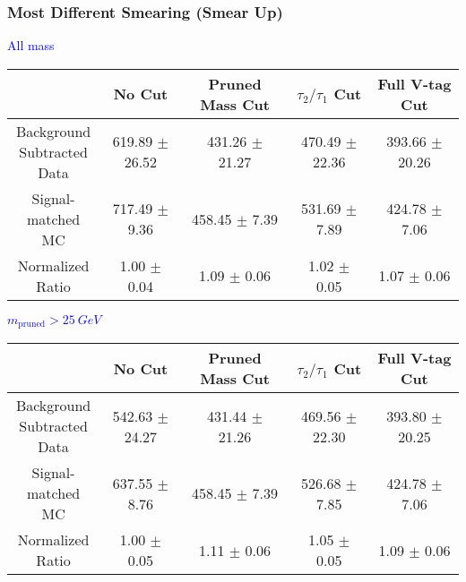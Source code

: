 \documentclass{beamer}
\begin{document}
\begin{frame}
  \frametitle{Most Different Smearing (Smear Up)}
  \begin{adjustwidth}{-1.5em}{-1.5em}
    \centering
    \vspace{6pt}
    \textcolor{blue}{All mass}
    \vspace{6pt}

    {\scriptsize
      \begin{tabular}{c | c | c | c | c}
\hline
 & No Cut & Pruned Mass Cut & $\tau_2/\tau_1$ Cut & Full V-tag Cut \\
\hline
\makecell{Background \\ Subtracted \\ Data} & 619.89 $\pm$ 26.52 & 431.26 $\pm$ 21.27 & 470.49 $\pm$ 22.36 & 393.66 $\pm$ 20.26 \\
\makecell{Signal-\\ matched MC} & 717.49 $\pm$ 9.36 & 458.45 $\pm$ 7.39 & 531.69 $\pm$ 7.89 & 424.78 $\pm$ 7.06 \\
\hline
\makecell{Normalized \\ Ratio} & 1.00 $\pm$ 0.04 & 1.09 $\pm$ 0.06 & 1.02 $\pm$ 0.05 & 1.07 $\pm$ 0.06 \\
\hline
      \end{tabular}
    }

    \vspace{6pt}
    \textcolor{blue}{$m_\text{pruned} > \SI{25}{GeV}$}
    \vspace{6pt}

    {\scriptsize
      \begin{tabular}{c | c | c | c | c}
\hline
 & No Cut & Pruned Mass Cut & $\tau_2/\tau_1$ Cut & Full V-tag Cut \\
\hline
\makecell{Background \\ Subtracted \\ Data} & 542.63 $\pm$ 24.27 & 431.44 $\pm$ 21.26 & 469.56 $\pm$ 22.30 & 393.80 $\pm$ 20.25 \\
\makecell{Signal-\\ matched MC} & 637.55 $\pm$ 8.76 & 458.45 $\pm$ 7.39 & 526.68 $\pm$ 7.85 & 424.78 $\pm$ 7.06 \\
\hline
\makecell{Normalized \\ Ratio} & 1.00 $\pm$ 0.05 & 1.11 $\pm$ 0.06 & 1.05 $\pm$ 0.05 & 1.09 $\pm$ 0.06 \\
\hline
      \end{tabular}
    }
  \end{adjustwidth}
\end{frame}
\end{document}
